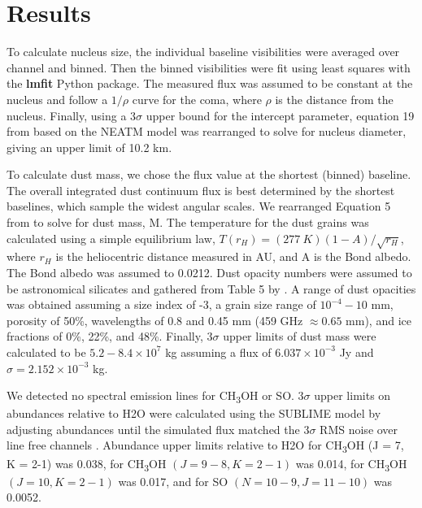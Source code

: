 \section{Results} \label{results}

To calculate nucleus size, the individual baseline visibilities were averaged over channel and binned. Then the binned visibilities were fit using least squares with the \textbf{lmfit} Python package. The measured flux was assumed to be constant at the nucleus and follow a \(1/\rho\) curve for the coma, where \(\rho\) is the distance from the nucleus.  Finally, using a \(3\sigma\) upper bound for the intercept parameter, equation 19 from \cite{Delbo2002} based on the NEATM model was rearranged to solve for nucleus diameter, giving an upper limit of 10.2 km.

To calculate dust mass, we chose the flux value at the shortest (binned) baseline. The overall integrated dust continuum flux is best determined by the shortest baselines, which sample the widest angular scales. We rearranged Equation 5 from \cite{Roth2023} to solve for dust mass, M. The temperature for the dust grains was calculated using a simple equilibrium law, \(T\left( r_{H} \right) = (277\ K)(1 - A)/\sqrt{r_{H}}\), where \(r_{H}\) is the heliocentric distance measured in AU, and A is the Bond albedo. The Bond albedo was assumed to 0.0212. Dust opacity numbers were assumed to be astronomical silicates and gathered from Table 5 by \cite{Boissier2012}. A range of dust opacities was obtained assuming a size index of -3, a grain size range of \(10^{- 4} - 10\) mm, porosity of 50\%, wavelengths of 0.8 and 0.45 mm (459 GHz \(\approx0.65\) mm), and ice fractions of 0\%, 22\%, and 48\%. Finally, \(3\sigma\) upper limits of dust mass were calculated to be \(5.2 - 8.4 \times 10^{7}\) kg assuming a flux of \(6.037 \times 10^{- 3}\) Jy and \(\sigma = 2.152 \times 10^{- 3}\) kg.

We detected no spectral emission lines for CH\textsubscript{3}OH or SO. \(3\sigma\) upper limits on abundances relative to H2O were calculated using the SUBLIME model by adjusting abundances until the simulated flux matched the \(3\sigma\) RMS noise over line free channels \citep{SUBLIME}. Abundance upper limits relative to H2O for CH\textsubscript{3}OH (J = 7, K = 2-1) was 0.038, for CH\textsubscript{3}OH \((J = 9-8, K = 2-1)\) was 0.014, for CH\textsubscript{3}OH \((J = 10, K = 2-1)\) was 0.017, and for SO \((N = 10-9, J = 11-10)\) was 0.0052.
